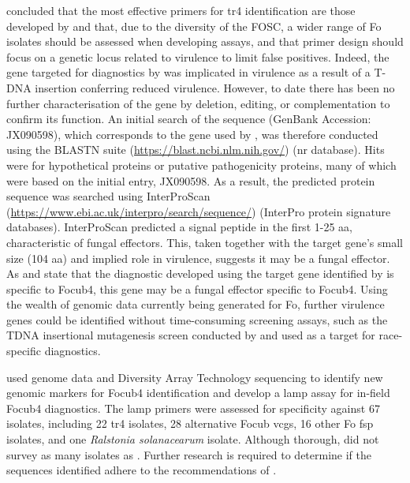 \textcite{Magdama2019} concluded that the most effective primers for \ac{tr4} identification are those developed by \textcite {Li2013b} and that, due to the diversity of the \ac{FOSC}, a wider range of \ac{Fo} isolates should be assessed when developing assays, and that primer design should focus on a genetic locus related to virulence to limit false positives.  Indeed, the gene targeted for diagnostics by \textcite {Li2013b} was implicated in virulence as a result of a T-DNA insertion conferring reduced virulence. However, to date there has been no further characterisation of the gene by deletion, editing, or complementation to confirm its function. An initial search of the sequence (GenBank Accession: JX090598), which corresponds to the gene used by \textcite{Li2013b}, was therefore conducted using the BLASTN suite (\href{https://blast.ncbi.nlm.nih.gov/Blast.cgi?PAGE=MegaBlast&PROGRAM=blastn&PAGE_TYPE=BlastSearch&BLAST_SPEC=}{https://blast.ncbi.nlm.nih.gov/}) (nr database). Hits were for hypothetical proteins or putative pathogenicity proteins, many of which were based on the initial entry, JX090598. As a result, the predicted protein sequence was searched using InterProScan (\href{https://www.ebi.ac.uk/interpro/search/sequence/}{https://www.ebi.ac.uk/inter\-pro/search/sequence/}) (InterPro protein signature databases). InterProScan predicted a signal peptide in the first 1-25 aa, characteristic of fungal effectors. This, taken together with the target gene's small size (104 aa) and implied role in virulence, suggests it may be a fungal effector. As \textcite {Li2013b} and \textcite{Magdama2019} state that the diagnostic developed using the target gene identified by \textcite {Li2013b} is specific to \ac{Focub4}, this gene may be a fungal effector specific to \ac{Focub4}. Using the wealth of genomic data currently being generated for \ac{Fo}, further virulence genes could be identified without time-consuming screening assays, such as the TDNA insertional mutagenesis screen conducted by \textcite {Li2013b} and used as a target for race-specific diagnostics. 


\textcite{Ordonez2019} used genome data and Diversity Array Technology sequencing to identify new genomic markers for \ac{Focub4} identification and develop a \ac{lamp} assay for in-field \ac{Focub4} diagnostics. The \ac{lamp} primers were assessed for specificity against 67 isolates, including 22 \ac{tr4} isolates, 28 alternative \ac{Focub} \acp{vcg}, 16 other \ac{Fo} \ac{fsp} isolates, and one \textit{Ralstonia solanacearum} isolate. Although thorough, \textcite{Ordonez2019}  did not survey as many isolates as \textcite{Magdama2019}. Further research is required to determine if the sequences identified adhere to the recommendations of \textcite{Magdama2019}. 

